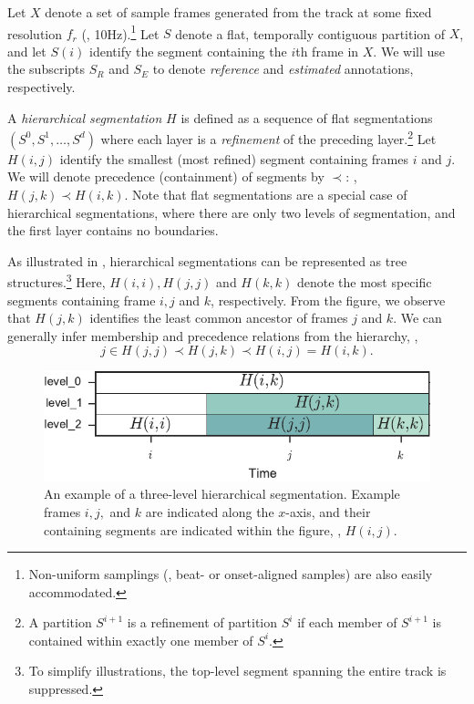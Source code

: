 \documentclass{article}
\begin{document}
Let $X$ denote a set of sample frames generated from the track at some fixed resolution $f_r$ (\eg,
10Hz).\footnote{Non-uniform samplings (\eg, beat- or onset-aligned samples) are also easily accommodated.}
Let $S $ denote a flat, temporally contiguous partition of $X$,
and let $S(i)$ identify the segment containing the $i$th frame in $X$.
We will use the subscripts $S_R$ and $S_E$ to denote \emph{reference} and \emph{estimated} annotations, respectively.

A \emph{hierarchical segmentation} $H$ is defined as a sequence of flat segmentations $(S^0, S^1, \dots, S^d)$ where each layer is a \emph{refinement}
of the preceding layer.\footnote{A partition $S^{i+1}$ is a refinement of partition $S^{i}$ if each member of $S^{i+1}$ is contained within exactly one member of $S^i$.}
Let $H(i,j)$ identify the smallest (most refined) segment containing frames $i$ and $j$.
We will denote precedence (containment) of segments by $\prec$: \eg, $H(j, k) \prec H(i, k)$.
Note that flat segmentations are a special case of hierarchical segmentations, where there are only two
levels of segmentation, and the first layer contains no boundaries.

As illustrated in , hierarchical segmentations can be represented as tree structures.\footnote{To simplify illustrations, 
the top-level segment spanning the entire track is suppressed.}
Here, $H(i, i), H(j, j)$ and $H(k,k)$ denote the most specific segments containing frame $i, j$ and $k$,
respectively.
From the figure, we observe that $H(j,k)$ identifies the least common ancestor of frames $j$ and $k$.
We can generally infer membership and precedence relations from the hierarchy, \eg,
\begin{equation}
j \in H(j, j) \prec H(j, k) \prec H(i, j) = H(i, k).
\end{equation}


\begin{figure}
  \centering
  \includegraphics[width=\columnwidth]{figs/hier-example.pdf}
  \caption{An example of a three-level hierarchical segmentation.
  Example frames $i, j,$ and $k$ are indicated along the $x$-axis, and their containing segments are indicated within the figure, \eg, $H(i, j)$.}
  \label{fig:hier-example}
\end{figure}
\end{document}
